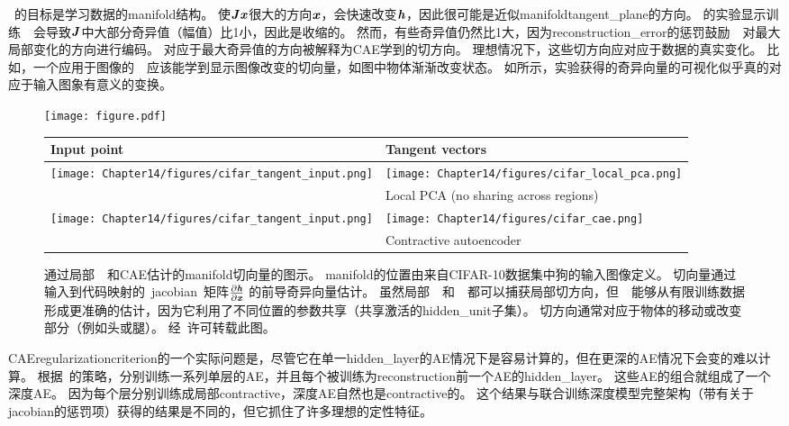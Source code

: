 ~的目标是学习数据的\gls{manifold}结构。
使$\boldsymbol{\mathit{J}}\boldsymbol{\mathit{x}}$很大的方向$\boldsymbol{\mathit{x}}$，会快速改变$\boldsymbol{\mathit{h}}$，因此很可能是近似\gls{manifold}\gls{tangent_plane}的方向。
\citet{Rifai+al-2011-small,Salah+al-2011-small}的实验显示训练~~会导致$\boldsymbol{\mathit{J}}$中大部分奇异值（幅值）比1小，因此是收缩的。
然而，有些奇异值仍然比1大，因为\gls{reconstruction_error}的惩罚鼓励~~对最大局部变化的方向进行编码。
对应于最大奇异值的方向被解释为\gls{CAE}学到的切方向。
理想情况下，这些切方向应对应于数据的真实变化。
比如，一个应用于图像的~~应该能学到显示图像改变的切向量，如图中物体渐渐改变状态。
如所示，实验获得的奇异向量的可视化似乎真的对应于输入图象有意义的变换。


\begin{figure}[ht]
\centering
\ifOpenSource
\centerline{\texttt{[image: figure.pdf]}}
\else
\begin{tabular}{p{.1\figwidth}|p{.86\figwidth}}
Input point & Tangent vectors\\
\hline 
\texttt{[image: Chapter14/figures/cifar\_tangent\_input.png]} & 
\texttt{[image: Chapter14/figures/cifar\_local\_pca.png]}\\
 & Local PCA (no sharing across regions)\\
 \hline
\texttt{[image: Chapter14/figures/cifar\_tangent\_input.png]} & 
\texttt{[image: Chapter14/figures/cifar\_cae.png]}\\
 & Contractive autoencoder\\
\end{tabular}
\fi
\caption{通过局部~~和\gls{CAE}估计的\gls{manifold}切向量的图示。
\gls{manifold}的位置由来自CIFAR-10数据集中狗的输入图像定义。
切向量通过输入到代码映射的~\gls{jacobian}~矩阵$\frac{\partial \boldsymbol{\mathit{h}}}{\partial \boldsymbol{\mathit{x}}}$ 的前导奇异向量估计。
虽然局部~~和~~都可以捕获局部切方向，但~~能够从有限训练数据形成更准确的估计，因为它利用了不同位置的参数共享（共享激活的\gls{hidden_unit}子集）。
切方向通常对应于物体的移动或改变部分（例如头或腿）。
经~\citet{Dauphin-et-al-NIPS2011-small}许可转载此图。
}
\label{fig:chap14_cifar_cae}
\end{figure}


\gls{CAE}\gls{regularization}\gls{criterion}的一个实际问题是，尽管它在单一\gls{hidden_layer}的\gls{AE}情况下是容易计算的，但在更深的\gls{AE}情况下会变的难以计算。
根据~\citet{Rifai+al-2011-small}的策略，分别训练一系列单层的\gls{AE}，并且每个被训练为\gls{reconstruction}前一个\gls{AE}的\gls{hidden_layer}。
这些\gls{AE}的组合就组成了一个深度\gls{AE}。
因为每个层分别训练成局部\gls{contractive}，深度\gls{AE}自然也是\gls{contractive}的。
这个结果与联合训练深度模型完整架构（带有关于\gls{jacobian}的惩罚项）获得的结果是不同的，但它抓住了许多理想的定性特征。


